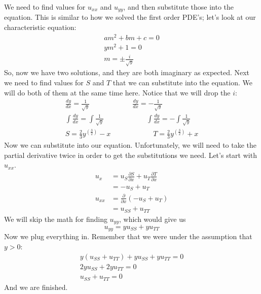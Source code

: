 We need to find values for $u_{xx}$ and $u_{yy}$, and then substitute those into
the equation. This is similar to how we solved the first order PDE's; let's look
at our characteristic equation:
\begin{gather*}
am^{2} + bm + c = 0\\
ym^{2} + 1 = 0\\
m = \pm \frac{i}{\sqrt{y}}
\end{gather*}
\noindent So, now we have two solutions, and they are both imaginary as expected.
Next we need to find values for $S$ and $T$ that we can substitute into the
equation. We will do both of them at the same time here. Notice that we will
drop the $i$:
\begin{gather*}
\frac{dy}{dx} = \frac{1}{\sqrt{y}} \qquad\qquad\qquad \frac{dy}{dx} = -\frac{1}{\sqrt{y}}\\
\int\frac{dy}{dx} =\int\frac{1}{\sqrt{y}} \qquad\qquad\qquad \int\frac{dy}{dx} = -\int\frac{1}{\sqrt{y}}\\
S = \frac{2}{3}y^{\left(\frac{3}{2}\right)} - x \qquad\qquad\qquad T = \frac{2}{3}y^{\left(\frac{3}{2}\right)} + x
\end{gather*}
\noindent Now we can substitute into our equation. Unfortunately, we will need
to take the partial derivative twice in order to get the substitutions we need.
Let's start with $u_{xx}$.
\begin{align*}
u_{x} &= u_{S}\frac{\partial S}{\partial x} + u_{T}\frac{\partial T}{\partial x}\\
&= -u_{S} + u_{T}\\
u_{xx} &= \frac{\partial}{\partial x}(-u_{S} + u_{T})\\
&= u_{SS} + u_{TT}
\end{align*}
\noindent We will skip the math for finding $u_{yy}$, which would give us
\[
u_{yy} = yu_{SS} + yu_{TT}
\]
\noindent Now we plug everything in. Remember that we were under the assumption
that $y > 0$:
\begin{gather*}
y(u_{SS} + u_{TT}) + yu_{SS} + yu_{TT} = 0\\
2yu_{SS} + 2yu_{TT} = 0\\
u_{SS} + u_{TT} = 0
\end{gather*}
\noindent And we are finished.
